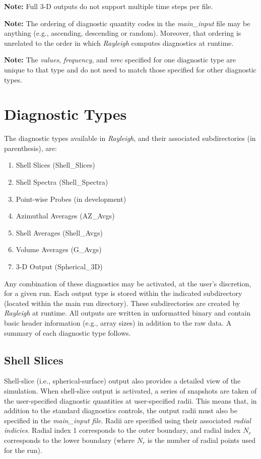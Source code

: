 \documentclass[12pt,letterpaper]{article}
\begin{document}
\noindent\textbf{Note: } Full 3-D outputs do not support multiple time steps per file.

\noindent\textbf{Note: } The ordering of diagnostic quantity codes in the \textit{main\_input} file may be anything (e.g., ascending, descending or random).  Moreover, that ordering is unrelated to the order in which \textit{Rayleigh} computes diagnostics at runtime.

\noindent\textbf{Note: } The \textit{values}, \textit{frequency}, and \textit{nrec} specified for one diagnostic type are unique to that type and do not need to match those specified for other diagnostic types.

\section{Diagnostic Types}\label{sec:dtypes}
The diagnostic types available in \textit{Rayleigh}, and their associated subdirectories (in parenthesis), are:
\begin{enumerate}
\item Shell Slices (Shell\_Slices)
\item Shell Spectra (Shell\_Spectra)
\item Point-wise Probes (in development)
\item Azimuthal Averages (AZ\_Avgs)
\item Shell Averages (Shell\_Avgs)
\item Volume Averages (G\_Avgs)
\item 3-D Output (Spherical\_3D)
\end{enumerate}
Any combination of these diagnostics may be activated, at the user's discretion, for a given run.  Each output type is stored within the indicated subdirectory (located within the main run directory).  These subdirectories are created by \textit{Rayleigh} at runtime.  All outputs are written in unformatted binary and contain basic header information (e.g., array sizes) in addition to the raw data.  A summary of each diagnostic type follows.


\subsection{Shell Slices}
Shell-slice (i.e., spherical-surface) output also provides a detailed view of the simulation.  When shell-slice output is activated, a series of snapshots are taken of the user-specified diagnostic quantities at user-specified radii.  This means that, in addition to the standard diagnostics controls, the output radii must also be specified in the \textit{main\_input file}. Radii are specified using their associated \textit{radial indicies}.  Radial index 1 corresponds to the outer boundary, and radial index $N_r$ corresponds to the lower boundary (where $N_r$ is the number of radial points used for the run). 
\end{document}
